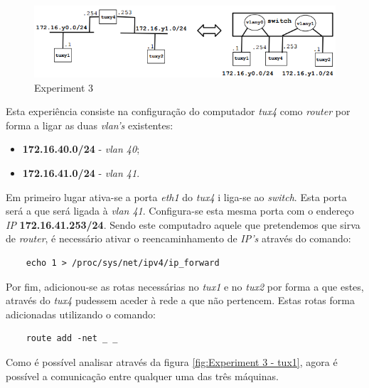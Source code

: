 \documentclass[a4paper]{article}
\begin{document}
	\begin{figure}[H]
	\begin{center}
  	\includegraphics[width=0.8\linewidth]{exp3.png}
  	\caption{Experiment 3}
  	\label{fig:Experiment 3}
	\end{center}
	\end{figure}

	Esta experiência consiste na configuração do computador \textit{tux4} como \textit{router} por forma a ligar as duas \textit{vlan's} existentes:

	\begin{itemize}
	\item \textbf{172.16.40.0/24} - \textit{vlan 40};
	\item \textbf{172.16.41.0/24} - \textit{vlan 41}.
	\end{itemize}

	Em primeiro lugar ativa-se a porta \textit{eth1} do \textit{tux4} i liga-se ao \textit{switch}. Esta porta será a que será ligada à \textit{vlan 41}. Configura-se esta mesma porta com o endereço \textit{IP} \textbf{172.16.41.253/24}. Sendo este computadro aquele que pretendemos que sirva de \textit{router}, é necessário ativar o reencaminhamento de \textit{IP's} através do comando:

	
	\begin{lstlisting}	
	echo 1 > /proc/sys/net/ipv4/ip_forward
	\end{lstlisting}

	Por fim, adicionou-se as rotas necessárias no \textit{tux1} e no \textit{tux2} por forma a que estes, através do \textit{tux4} pudessem aceder à rede a que não pertencem. Estas rotas forma adicionadas utilizando o comando:

	\begin{lstlisting}
	route add -net _ _
	\end{lstlisting}

	Como é possível analisar através da figura \ref{fig:Experiment 3 - tux1}, agora é possível a comunicação entre qualquer uma das três máquinas.
\end{document}
